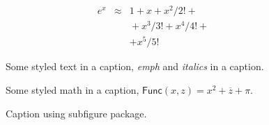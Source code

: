 \lipsum[1]

\begin{eqnarray}
 e^x &\approx& 1+x+x^2/2! + \\
   && {}+x^3/3! + x^4/4! + \\
   && + x^5/5!
\end{eqnarray}

\begin{figure}
\framebox[\textwidth]{\parbox{\textwidth}{\lipsum[2]}}
\caption{Some styled text in a caption, \emph{emph} and \textit{italics} in a caption.}
\end{figure}

\begin{figure}
\framebox[\textwidth]{\parbox{\textwidth}{\lipsum[2]}}
\caption{Some styled math in a caption, $\mathsf{Func}(x, z) = x^2 + \overline{z} + \pi$.}
\end{figure}

\begin{figure}
\centering
{}
\hfill
{}
\caption{Caption using subfigure package.}
\end{figure}

\lipsum[2-4]
